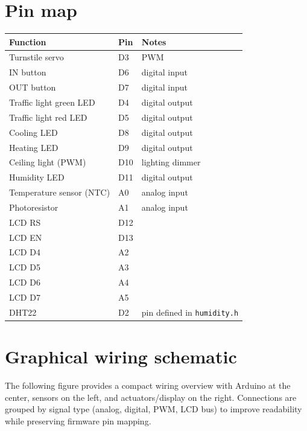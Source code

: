\section{Pin map}
\begin{longtable}{@{}lll@{}}
\toprule
Function & Pin & Notes \\
\midrule
Turnstile servo & D3 & PWM \\
IN button & D6 & digital input \\
OUT button & D7 & digital input \\
Traffic light green LED & D4 & digital output \\
Traffic light red LED & D5 & digital output \\
Cooling LED & D8 & digital output \\
Heating LED & D9 & digital output \\
Ceiling light (PWM) & D10 & lighting dimmer \\
Humidity LED & D11 & digital output \\
Temperature sensor (NTC) & A0 & analog input \\
Photoresistor & A1 & analog input \\
LCD RS & D12 & \\
LCD EN & D13 & \\
LCD D4 & A2 & \\
LCD D5 & A3 & \\
LCD D6 & A4 & \\
LCD D7 & A5 & \\
DHT22 & D2 & pin defined in \texttt{humidity.h} \\
\bottomrule
\end{longtable}

\section{Graphical wiring schematic}
The following figure provides a compact wiring overview with Arduino at the center, sensors on the left, and actuators/display on the right. Connections are grouped by signal type (analog, digital, PWM, LCD bus) to improve readability while preserving firmware pin mapping.

